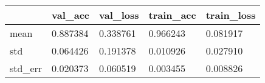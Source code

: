 \begin{tabular}{|l|l|l|l|l|}
\toprule \hline
 & val\_acc & val\_loss & train\_acc & train\_loss \\ \hline
\midrule
mean & 0.887384 & 0.338761 & 0.966243 & 0.081917 \\ \hline
std & 0.064426 & 0.191378 & 0.010926 & 0.027910 \\ \hline
std\_err & 0.020373 & 0.060519 & 0.003455 & 0.008826 \\ \hline
\bottomrule
\end{tabular}
